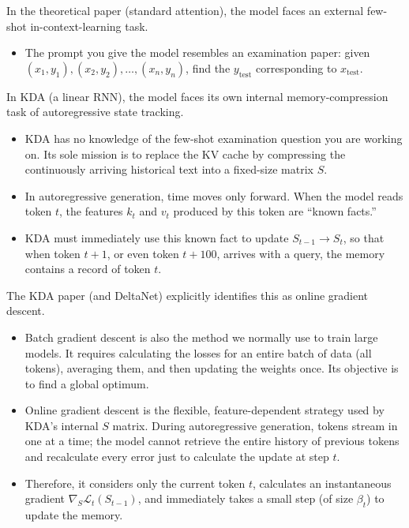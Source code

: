 In the theoretical paper (standard attention), the model faces an external few-shot in-context-learning task.

\begin{itemize}
\tightlist
\item
  The prompt you give the model resembles an examination paper: given \((x_1,y_1),(x_2,y_2),\ldots,(x_n,y_n)\), find the \(y_{\mathrm{test}}\) corresponding to \(x_{\mathrm{test}}\).
\end{itemize}

In KDA (a linear RNN), the model faces its own internal memory-compression task of autoregressive state tracking.

\begin{itemize}
\tightlist
\item
  KDA has no knowledge of the few-shot examination question you are working on. Its sole mission is to replace the KV cache by compressing the continuously arriving historical text into a fixed-size matrix \(S\).
\item
  In autoregressive generation, time moves only forward. When the model reads token \(t\), the features \(k_t\) and \(v_t\) produced by this token are ``known facts.''
\item
  KDA must immediately use this known fact to update \(S_{t-1}\to S_t\), so that when token \(t+1\), or even token \(t+100\), arrives with a query, the memory contains a record of token \(t\).
\end{itemize}

The KDA paper (and DeltaNet) explicitly identifies this as online gradient descent.

\begin{itemize}
\tightlist
\item
  Batch gradient descent is also the method we normally use to train large models. It requires calculating the losses for an entire batch of data (all tokens), averaging them, and then updating the weights once. Its objective is to find a global optimum.
\item
  Online gradient descent is the flexible, feature-dependent strategy used by KDA's internal \(S\) matrix. During autoregressive generation, tokens stream in one at a time; the model cannot retrieve the entire history of previous tokens and recalculate every error just to calculate the update at step \(t\).
\item
  Therefore, it considers only the current token \(t\), calculates an instantaneous gradient \(\nabla_S\mathcal{L}_t(S_{t-1})\), and immediately takes a small step (of size \(\beta_t\)) to update the memory.
\end{itemize}

